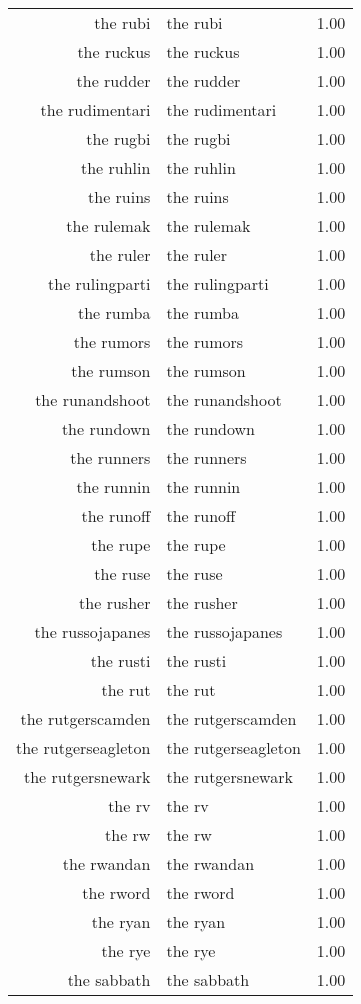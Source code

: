 \begin{table}[ht]
\begin{tabular}{rlr}
  the rubi & the rubi & 1.00 \\ 
  the ruckus & the ruckus & 1.00 \\ 
  the rudder & the rudder & 1.00 \\ 
  the rudimentari & the rudimentari & 1.00 \\ 
  the rugbi & the rugbi & 1.00 \\ 
  the ruhlin & the ruhlin & 1.00 \\ 
  the ruins & the ruins & 1.00 \\ 
  the rulemak & the rulemak & 1.00 \\ 
  the ruler & the ruler & 1.00 \\ 
  the rulingparti & the rulingparti & 1.00 \\ 
  the rumba & the rumba & 1.00 \\ 
  the rumors & the rumors & 1.00 \\ 
  the rumson & the rumson & 1.00 \\ 
  the runandshoot & the runandshoot & 1.00 \\ 
  the rundown & the rundown & 1.00 \\ 
  the runners & the runners & 1.00 \\ 
  the runnin & the runnin & 1.00 \\ 
  the runoff & the runoff & 1.00 \\ 
  the rupe & the rupe & 1.00 \\ 
  the ruse & the ruse & 1.00 \\ 
  the rusher & the rusher & 1.00 \\ 
  the russojapanes & the russojapanes & 1.00 \\ 
  the rusti & the rusti & 1.00 \\ 
  the rut & the rut & 1.00 \\ 
  the rutgerscamden & the rutgerscamden & 1.00 \\ 
  the rutgerseagleton & the rutgerseagleton & 1.00 \\ 
  the rutgersnewark & the rutgersnewark & 1.00 \\ 
  the rv & the rv & 1.00 \\ 
  the rw & the rw & 1.00 \\ 
  the rwandan & the rwandan & 1.00 \\ 
  the rword & the rword & 1.00 \\ 
  the ryan & the ryan & 1.00 \\ 
  the rye & the rye & 1.00 \\ 
  the sabbath & the sabbath & 1.00 \\ 

\end{tabular}
\end{table}

